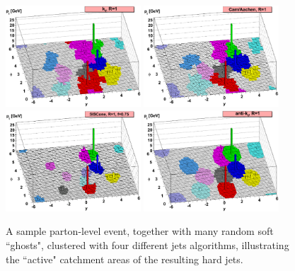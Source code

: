 \begin{figure}[h]
\begin{center}
\includegraphics*[width=0.45\textwidth] {figures/kt_stuff/kt}
\includegraphics*[width=0.45\textwidth] {figures/kt_stuff/ca}\\
\includegraphics*[width=0.45\textwidth] {figures/kt_stuff/siscone}
\includegraphics*[width=0.45\textwidth] {figures/kt_stuff/antikt}
\caption[A sample parton-level event]{A sample parton-level event, together with many random soft
``ghosts", clustered with four different jets algorithms, illustrating the ``active" catchment areas of
the resulting hard jets\cite{Cacciari:2008gp}.}
\label{fig:jetalgo}
\end{center}
\end{figure}

